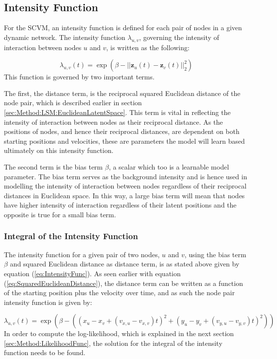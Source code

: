 \subsection{Intensity Function}
\label{sec:Method:IntensityFunc}
For the SCVM, an intensity function is defined for each pair of nodes in a given dynamic network.
The intensity function $\lambda_{u,v}$, governing the intensity of interaction between nodes $u$ and $v$, is written as the following:

\begin{equation}
    \lambda_{u,v}(t)
    =
    \exp \left(\beta - ||\textbf{z}_u(t) - \textbf{z}_v(t)||_2^2\right)
    \label{eq:IntensityFunc}
\end{equation}
This function is governed by two important terms.

The first, the distance term, is the reciprocal squared Euclidean distance of the node pair, which is described earlier in section \ref{sec:Method:LSM:EuclideanLatentSpace}.
This term is vital in reflecting the intensity of interaction between nodes as their reciprocal distance.
As the positions of nodes, and hence their reciprocal distances, are dependent on both starting positions and velocities, these are parameters the model will learn based ultimately on this intensity function.

The second term is the bias term $\beta$, a scalar which too is a learnable model parameter. 
The bias term serves as the background intensity and is hence used in modelling the intensity of interaction between nodes regardless of their reciprocal distances in Euclidean space. 
In this way, a large bias term will mean that nodes have higher intensity of interaction regardless of their latent positions and the opposite is true for a small bias term.


\subsubsection{Integral of the Intensity Function}
\label{sec:Method:IntensityFunc:IntegralIntensityFunc}
The intensity function for a given pair of two nodes, $u$ and $v$, using the bias term $\beta$ and squared Euclidean distance as distance term, is as stated above given by equation (\ref{eq:IntensityFunc}).
As seen earlier with equation (\ref{eq:SquaredEuclideanDistance}), the distance term can be written as a function of the starting position plus the velocity over time, and as such the node pair intensity function is given by:

\begin{equation}
    \lambda_{u,v}(t)
    =
    \exp \left(\beta - \left((x_u - x_v + (v_{x,u} - v_{x,v})t)^2 + (y_u - y_v + ( v_{y,u} - v_{y,v})t)^2\right)\right)
\end{equation}
In order to compute the log-likelihood, which is explained in the next section \ref{sec:Method:LikelihoodFunc}, the solution for the integral of the intensity function needs to be found. 

